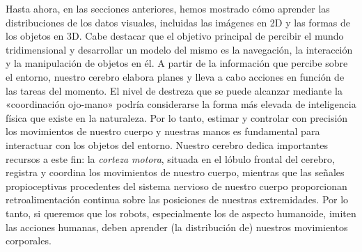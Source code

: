 \documentclass[../../book-main_es.tex]{subfiles}
\begin{document}
Hasta ahora, en las secciones anteriores, hemos mostrado cómo aprender las
distribuciones de los datos visuales, incluidas las imágenes en 2D y las formas 
de los objetos en 3D.  Cabe destacar que el objetivo principal de percibir el 
mundo tridimensional y desarrollar un modelo del mismo es la navegación, la interacción y 
la manipulación de objetos en él. A partir de la información que percibe sobre el 
entorno, nuestro cerebro elabora planes y lleva a cabo acciones en función de las 
tareas del momento. El nivel de destreza que se puede alcanzar mediante la 
«coordinación ojo-mano» podría considerarse la forma más elevada de inteligencia 
física que existe en la naturaleza. Por lo tanto, estimar y controlar con precisión 
los movimientos de nuestro cuerpo y nuestras manos es fundamental para interactuar con 
los objetos del entorno. Nuestro cerebro dedica importantes recursos a este fin: la 
{\em corteza motora}, situada en el lóbulo frontal del cerebro, registra y coordina
los movimientos de nuestro cuerpo, mientras que las señales propioceptivas procedentes del
sistema nervioso de nuestro cuerpo proporcionan retroalimentación continua sobre las posiciones de 
nuestras extremidades.  Por lo tanto, si queremos que los robots, especialmente los de 
aspecto humanoide, imiten las acciones humanas, deben aprender (la distribución de) nuestros
movimientos corporales.
\end{document}
